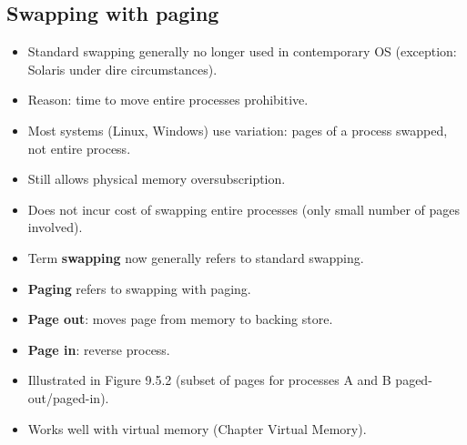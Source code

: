 \subsection{Swapping with paging}
\begin{itemize}
    \item Standard swapping generally no longer used in contemporary OS (exception: Solaris under dire circumstances).
    \item Reason: time to move entire processes prohibitive.
    \item Most systems (Linux, Windows) use variation: pages of a process swapped, not entire process.
    \item Still allows physical memory oversubscription.
    \item Does not incur cost of swapping entire processes (only small number of pages involved).
    \item Term \textbf{swapping} now generally refers to standard swapping.
    \item \textbf{Paging} refers to swapping with paging.
    \item \textbf{Page out}: moves page from memory to backing store.
    \item \textbf{Page in}: reverse process.
    \item Illustrated in Figure 9.5.2 (subset of pages for processes A and B paged-out/paged-in).
    \item Works well with virtual memory (Chapter Virtual Memory).
\end{itemize}

